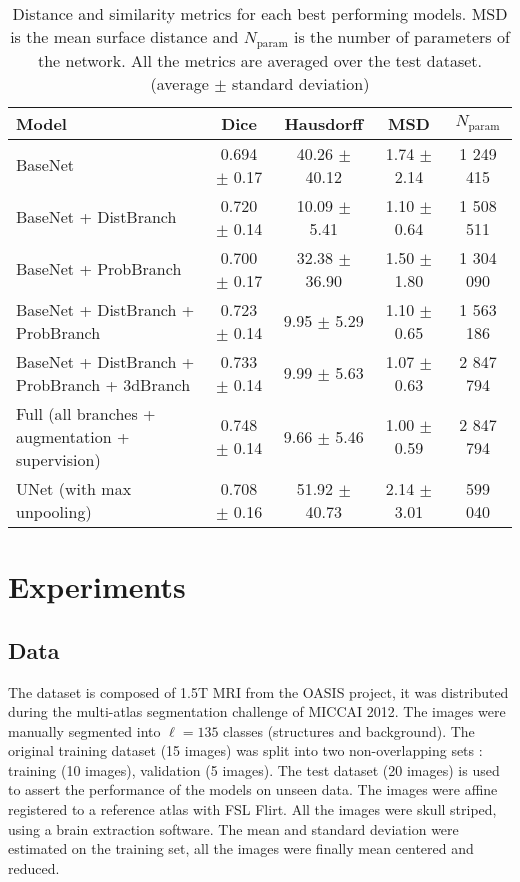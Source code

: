 \documentclass{article}
\begin{document}
\begin{table*}[t]
  \centering
  \begin{tabular}{|l|c|c|c|c|}
    \hline
    Model & Dice & Hausdorff & MSD & $N_{\text{param}}$ \\
    \hline
    BaseNet & 0.694 $\pm$ 0.17 & 40.26 $\pm$ 40.12 & 1.74 $\pm$ 2.14 & 1 249 415\\
    BaseNet + DistBranch & 0.720 $\pm$ 0.14 &  10.09 $\pm$ 5.41 & 1.10 $\pm$ 0.64 & 1 508 511\\
    BaseNet + ProbBranch & 0.700 $\pm$ 0.17 & 32.38 $\pm$ 36.90 & 1.50 $\pm$ 1.80 & 1 304 090\\
    BaseNet + DistBranch + ProbBranch& 0.723 $\pm$ 0.14 & 9.95 $\pm$ 5.29  & 1.10 $\pm$ 0.65 & 1 563 186\\
    BaseNet + DistBranch + ProbBranch + 3dBranch& 0.733 $\pm$ 0.14 & 9.99 $\pm$ 5.63 & 1.07 $\pm$ 0.63 & 2 847 794\\
    Full (all branches + augmentation + supervision) & 0.748 $\pm$ 0.14 & 9.66 $\pm$ 5.46 & 1.00 $\pm$ 0.59 & 2 847 794\\
    \hline
    UNet (with max unpooling) \cite{DBLP:journals/corr/RoyCSKNW17} & 0.708 $\pm$ 0.16 & 51.92 $\pm$ 40.73 & 2.14 $\pm$ 3.01 & 599 040\\
    \hline
  \end{tabular}
  \caption{Distance and similarity metrics for each best performing models. MSD is the mean surface distance and $N_{\text{param}}$ is the number of parameters of the network. All the metrics are averaged over the test dataset. (average $\pm$ standard deviation)}
  \label{tab:results}
\end{table*}

\section{Experiments}
\subsection{Data}
The dataset is composed of 1.5T MRI from the OASIS project, it was distributed during the multi-atlas segmentation challenge of MICCAI 2012. The images were manually segmented into $\ell=135$ classes (structures and background). The original training dataset (15 images) was split into two non-overlapping sets : training (10 images), validation (5 images). The test dataset (20 images) is used to assert the performance of the models on unseen data. The images were affine registered to a reference atlas with FSL Flirt\cite{jenkinson2002}.
All the images were skull striped, using a brain extraction software. The mean and standard deviation were estimated on the training set, all the images were finally mean centered and reduced.
\end{document}
